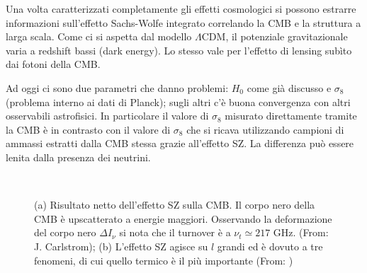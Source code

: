 Una volta caratterizzati completamente gli effetti cosmologici si possono estrarre informazioni sull'effetto Sachs-Wolfe integrato correlando la CMB e la struttura a larga scala. Come ci si aspetta dal modello $\Lambda$CDM, il potenziale gravitazionale varia a redshift bassi (dark energy). Lo stesso vale per l'effetto di lensing subìto dai fotoni della CMB. 

Ad oggi ci sono due parametri che danno problemi: $H_0$ come già discusso e $\sigma_8$ (problema interno ai dati di Planck); sugli altri c'è buona convergenza con altri osservabili astrofisici. In particolare il valore di $\sigma_8$ misurato direttamente tramite la CMB è in contrasto con il valore di $\sigma_8$ che si ricava utilizzando campioni di ammassi estratti dalla CMB stessa grazie all'effetto SZ. La differenza può essere lenita dalla presenza dei neutrini.

\begin{figure}[ht]
    $\;\;$
    \caption{(a) Risultato netto dell'effetto SZ sulla CMB. Il corpo nero della CMB è upscatterato a energie maggiori. Osservando la deformazione del corpo nero $\Delta I_\nu$ si nota che il turnover è a $\nu_t \simeq 217$ GHz.  (From: J. Carlstrom); (b) L'effetto SZ agisce su $l$ grandi ed è dovuto a tre fenomeni, di cui quello termico è il più importante (From: \cite{Cooray_2002})} \label{fig11:sz} 
\end{figure}


